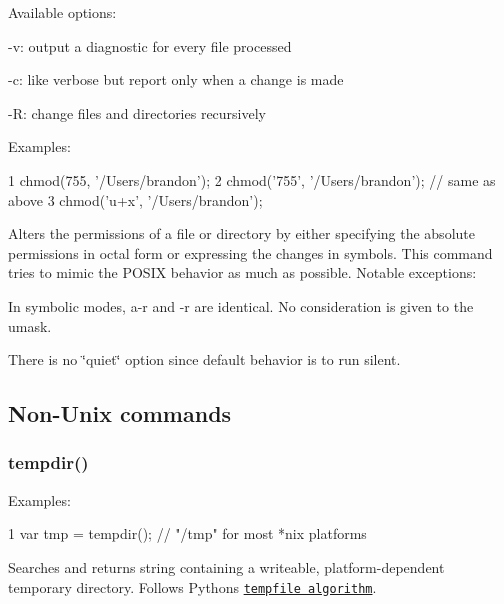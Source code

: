 Available options\+:


\begin{DoxyItemize}
\item {\ttfamily -\/v}\+: output a diagnostic for every file processed
\item {\ttfamily -\/c}\+: like verbose but report only when a change is made
\item {\ttfamily -\/\+R}\+: change files and directories recursively
\end{DoxyItemize}

Examples\+:


\begin{DoxyCode}
1 chmod(755, '/Users/brandon');
2 chmod('755', '/Users/brandon'); // same as above
3 chmod('u+x', '/Users/brandon');
\end{DoxyCode}


Alters the permissions of a file or directory by either specifying the absolute permissions in octal form or expressing the changes in symbols. This command tries to mimic the P\+O\+S\+I\+X behavior as much as possible. Notable exceptions\+:


\begin{DoxyItemize}
\item In symbolic modes, \textquotesingle{}a-\/r\textquotesingle{} and \textquotesingle{}-\/r\textquotesingle{} are identical. No consideration is given to the umask.
\item There is no \char`\"{}quiet\char`\"{} option since default behavior is to run silent.
\end{DoxyItemize}

\subsection*{Non-\/\+Unix commands}

\subsubsection*{tempdir()}

Examples\+:


\begin{DoxyCode}
1 var tmp = tempdir(); // "/tmp" for most *nix platforms
\end{DoxyCode}


Searches and returns string containing a writeable, platform-\/dependent temporary directory. Follows Python\textquotesingle{}s \href{http://docs.python.org/library/tempfile.html#tempfile.tempdir}{\tt tempfile algorithm}.

